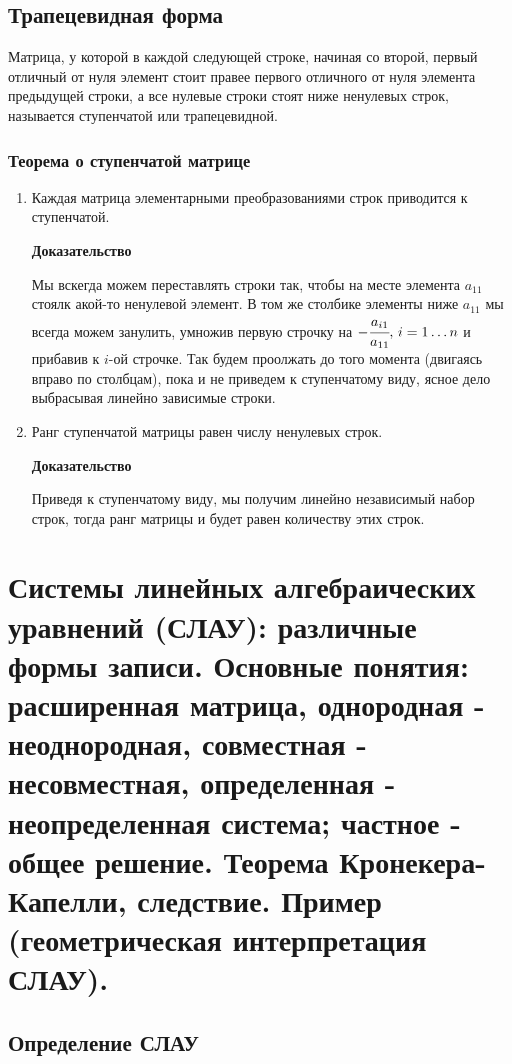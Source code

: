 \documentclass{article}
\begin{document}
\subsection{Трапецевидная форма}
Матрица, у которой в каждой следующей строке, начиная со второй, первый отличный от нуля элемент стоит правее первого отличного от нуля элемента предыдущей строки, а все нулевые строки стоят ниже ненулевых строк, называется ступенчатой или трапецевидной.

\subsubsection{Теорема о ступенчатой матрице}
\begin{enumerate}
    \item Каждая матрица элементарными преобразованиями строк приводится к ступенчатой.
    
    \textbf{Доказательство}
    
    Мы вскегда можем переставлять строки так, чтобы на месте элемента $a_{11}$ стоялк акой-то ненулевой элемент. В том же столбике элементы ниже $a_{11}$ мы всегда можем занулить, умножив первую строчку на $-\cfrac{a_{i1}}{a_{11}},\,i=1\ldots n$ и прибавив к $i$-ой строчке. Так будем проолжать до того момента (двигаясь вправо по столбцам), пока и не приведем к ступенчатому виду, ясное дело выбрасывая линейно зависимые строки.
    
    \item Ранг ступенчатой матрицы равен числу ненулевых строк.
    
    \textbf{Доказательство}
    
    Приведя к ступенчатому виду, мы получим линейно независимый набор строк, тогда ранг матрицы и будет равен количеству этих строк.
\end{enumerate}

\newpage
\section{Системы линейных алгебраических уравнений (СЛАУ): различные формы записи. Основные понятия: расширенная матрица, однородная - неоднородная, совместная - несовместная, определенная - неопределенная система; частное - общее решение. Теорема Кронекера-Капелли, следствие. Пример (геометрическая интерпретация СЛАУ).}
\subsection{Определение СЛАУ}
\end{document}
